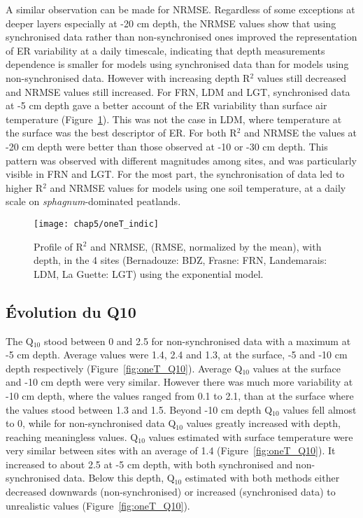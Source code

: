 A similar observation can be made for NRMSE.
Regardless of some exceptions at deeper layers especially at -20 cm depth, the NRMSE values show that using synchronised data rather than non-synchronised ones improved the representation of ER variability at a daily timescale, indicating that depth measurements dependence is smaller for models using synchronised data than for models using non-synchronised data.
However with increasing depth R$^{2}$ values still decreased and NRMSE values still increased.
For FRN, LDM and LGT, synchronised data at -5 cm depth gave a better account of the ER variability than surface air temperature (Figure~\ref{fig:models_comparison}).
This was not the case in LDM, where temperature at the surface was the best descriptor of ER.
For both R$^{2}$ and NRMSE the values at -20 cm depth were better than those observed at -10 or -30 cm depth.
This pattern was observed with different magnitudes among sites, and was particularly visible in FRN and LGT.
For the most part, the synchronisation of data led to higher R$^{2}$ and NRMSE values for models using one soil temperature, at a daily scale on \textit{sphagnum}-dominated peatlands.

\begin{figure}[]
\centering
\texttt{[image: chap5/oneT\_indic]}
\caption{Profile of R$^{2}$ and NRMSE, (RMSE, normalized by the mean), with depth, in the 4 sites (Bernadouze: BDZ, Frasne: FRN, Landemarais: LDM, La Guette: LGT) using the exponential model.}
\label{fig:models_comparison}
\end{figure}

\subsection{Évolution du Q10}

The Q$_{10}$ stood between 0 and 2.5 for non-synchronised data with a maximum at -5 cm depth.
Average values were 1.4, 2.4 and 1.3, at the surface, -5 and -10 cm depth respectively (Figure~\ref{fig:oneT_Q10}).
Average Q$_{10}$ values at the surface and -10 cm depth were very similar.
However there was much more variability at -10 cm depth, where the values ranged from 0.1 to 2.1, than at the surface where the values stood between 1.3 and 1.5.
Beyond -10 cm depth Q$_{10}$ values fell almost to 0, while for non-synchronised data Q$_{10}$ values greatly increased with depth, reaching meaningless values.
Q$_{10}$ values estimated with surface temperature were very similar between sites with an average of 1.4 (Figure~\ref{fig:oneT_Q10}).
It increased to about 2.5 at -5 cm depth, with both synchronised and non-synchronised data.
Below this depth, Q$_{10}$ estimated with both methods either decreased downwards (non-synchronised) or increased (synchronised data) to unrealistic values (Figure~\ref{fig:oneT_Q10}).

